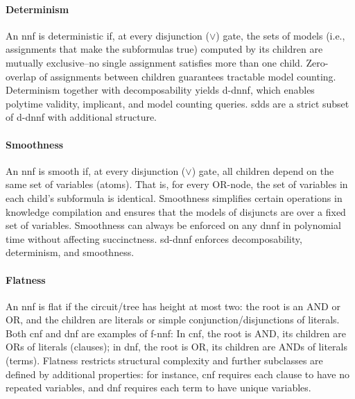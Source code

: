 \paragraph{Determinism}
An \acrshort{nnf} is deterministic if, at every disjunction ($\lor$) gate, the sets of models (i.e., assignments that make the subformulas true) computed by its children are mutually exclusive--no single assignment satisfies more than one child. 
Zero-overlap of assignments between children guarantees tractable model counting. Determinism together with decomposability yields \acrfull{d-dnnf}, which enables polytime validity, implicant, and model counting queries. \acrfull{sdd}s are a strict subset of \acrshort{d-dnnf} with additional structure.

\paragraph{Smoothness}
An \acrshort{nnf} is smooth if, at every disjunction ($\lor$) gate, all children depend on the same set of variables (atoms). That is, for every OR-node, the set of variables in each child's subformula is identical. Smoothness simplifies certain operations in knowledge compilation and ensures that the models of disjuncts are over a fixed set of variables. Smoothness can always be enforced on any \acrshort{dnnf} in polynomial time without affecting succinctness. \acrfull{sd-dnnf} enforces decomposability, determinism, and smoothness.

\paragraph{Flatness}
An \acrshort{nnf} is flat if the circuit/tree has height at most two: the root is an AND or OR, and the children are literals or simple conjunction/disjunctions of literals. Both \acrshort{cnf} and \acrshort{dnf} are examples of \acrfull{f-nnf}: In \acrshort{cnf}, the root is AND, its children are ORs of literals (clauses); in \acrshort{dnf}, the root is OR, its children are ANDs of literals (terms). Flatness restricts structural complexity and further subclasses are defined by additional properties: for instance, \acrshort{cnf} requires each clause to have no repeated variables, and \acrshort{dnf} requires each term to have unique variables.

